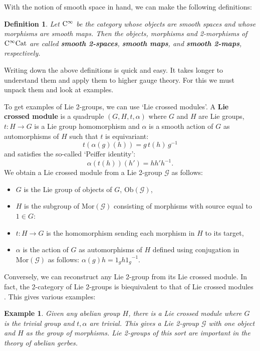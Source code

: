 \documentclass{article}
\newcommand{\maps}{\colon}
\newcommand{\Cat}{\mathrm{Cat}}
\newcommand{\Ob}{\mathrm{Ob}}
\newcommand{\Mor}{\mathrm{Mor}}
\def\twogroup {\mathcal{G}}
\def\G {G}
\newtheorem{definition}[theorem]{Definition}
\newtheorem{example}[theorem]{Example}
\newcommand{\et}{\hspace{-0.08in}{\bf .}\hspace{0.1in}}
\begin{document}
With the notion of smooth space in hand, we can make the following
definitions:

\begin{definition} \et
\label{smooth 2-space}
Let ${\rm C}^\infty$ be the category whose objects are 
smooth spaces and whose morphisms are smooth maps.   Then the objects, 
morphisms and 2-morphisms of ${\rm C}^\infty\Cat$ are called 
{\bf smooth 2-spaces}, {\bf smooth maps}, and {\bf smooth 2-maps}, 
respectively.
\end{definition}

Writing down the above definitions is quick and easy.  It takes 
longer to understand them and apply them to higher gauge theory.
For this we must unpack them and look at examples.   

To get examples of Lie 2-groups, we can use `Lie crossed modules'.  
A {\bf Lie crossed module} is a quadruple $(G,H,t,\alpha)$ 
where $G$ and $H$ are Lie 
groups, $t \maps H \to G$ is a Lie group homomorphism and 
$\alpha$ is a smooth action of $G$ as automorphisms of $H$ such
that $t$ is equivariant:
\[   t(\alpha(g)(h)) = g \, t(h)\, g^{-1} \]
and satisfies the so-called `Peiffer identity':
\[    \alpha(t(h))(h') = hh'h^{-1} . \]
We obtain a Lie crossed module from a Lie 2-group $\twogroup$ as
follows:
\begin{itemize}
\item $G$ is the Lie group of objects of $\G$, $\Ob(\twogroup)$,
\item $H$ is the subgroup of $\Mor(\twogroup)$ consisting
of morphisms with source equal to $1 \in G$:
\item $t \maps H \to G$ is the homomorphism sending each 
morphism in $H$ to its target,
\item $\alpha$ is the action of $G$ as automorphisms of $H$ 
defined using conjugation in $\Mor(\twogroup)$ as follows: 
$\alpha(g) h = 1_g h {1_g}^{-1}$. 
\end{itemize}
Conversely, we can reconstruct any Lie 2-group from its Lie 
crossed module.  In fact, the 2-category of Lie 2-groups is 
biequivalent to that of Lie crossed modules \cite{BaezLauda:2003}.
This gives various examples:

\begin{example} \et
\label{crossed.1} 
{\rm 
Given any abelian group $H$, there is a Lie crossed module
where $G$ is the trivial group and $t, \alpha$ are trivial.  
This gives a Lie 2-group $\twogroup$ with one object
and $H$ as the group of morphisms.  Lie 2-groups of this
sort are important in the theory of \emph{abelian} gerbes.
}\end{example}
\end{document}
